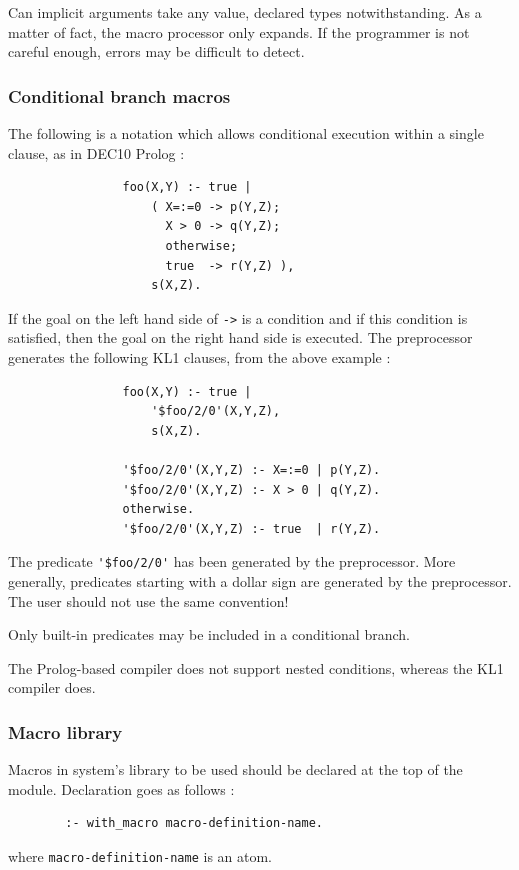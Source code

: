 \noindent\Caution
Can implicit arguments take any value, declared types notwithstanding.
As a matter of fact, the macro processor only expands. If the programmer is
not careful enough, errors may be difficult to detect.

\subsubsection{Conditional branch macros} 

The following is a notation which allows conditional execution within a single
clause, as in DEC10 Prolog :
\begin{verbatim}
                foo(X,Y) :- true |
                    ( X=:=0 -> p(Y,Z);
                      X > 0 -> q(Y,Z);
                      otherwise;
                      true  -> r(Y,Z) ),
                    s(X,Z).
\end{verbatim}\index{\verb|->|}
If the goal on the left hand side of \verb|->| is a condition and if this
condition is satisfied, then the goal on the right hand side is executed.
The preprocessor generates the following KL1 clauses, from the above
example :
\begin{verbatim}
                foo(X,Y) :- true |
                    '$foo/2/0'(X,Y,Z),
                    s(X,Z).

                '$foo/2/0'(X,Y,Z) :- X=:=0 | p(Y,Z).
                '$foo/2/0'(X,Y,Z) :- X > 0 | q(Y,Z).
                otherwise.
                '$foo/2/0'(X,Y,Z) :- true  | r(Y,Z).
\end{verbatim}
The predicate \verb|'$foo/2/0'| has been generated by the preprocessor. More
generally, predicates starting with a dollar sign are generated by the
preprocessor. The user should not use the same convention!

\Caution Only built-in predicates may be included in a conditional branch.

\Caution The Prolog-based compiler does not support nested conditions, whereas
the KL1 compiler does.

\subsubsection{Macro library} 

Macros in system's library to be used should be declared at the top
of the module. Declaration goes as follows :
\begin{verbatim}
        :- with_macro macro-definition-name.
\end{verbatim}
where \verb|macro-definition-name| is an atom. 

